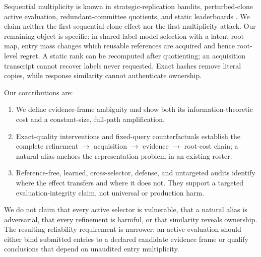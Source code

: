 Sequential multiplicity is known in strategic-replication bandits, perturbed-clone active evaluation, redundant-committee quotients, and static leaderboards \citep{shin2022strategicreplication,shin2025replicationproof,lanctot2026activeevaluation,nguyen2025unreal,singh2025leaderboard,hays2026strategic}. We claim neither the first sequential clone effect nor the first multiplicity attack. Our remaining object is specific: in shared-label model selection with a latent root map, entry mass changes which reusable references are acquired and hence root-level regret. A static rank can be recomputed after quotienting; an acquisition transcript cannot recover labels never requested. Exact hashes remove literal copies, while response similarity cannot authenticate ownership.

Our contributions are:
\begin{enumerate}
    \item We define evidence-frame ambiguity and show both its information-theoretic cost and a constant-size, full-path amplification.
    \item Exact-quality interventions and fixed-query counterfactuals establish the complete refinement $\rightarrow$ acquisition $\rightarrow$ evidence $\rightarrow$ root-cost chain; a natural alias anchors the representation problem in an existing roster.
    \item Reference-free, learned, cross-selector, defense, and untargeted audits identify where the effect transfers and where it does not. They support a targeted evaluation-integrity claim, not universal or production harm.
\end{enumerate}

We do not claim that every active selector is vulnerable, that a natural alias is adversarial, that every refinement is harmful, or that similarity reveals ownership. The resulting reliability requirement is narrower: an active evaluation should either bind submitted entries to a declared candidate evidence frame or qualify conclusions that depend on unaudited entry multiplicity.
